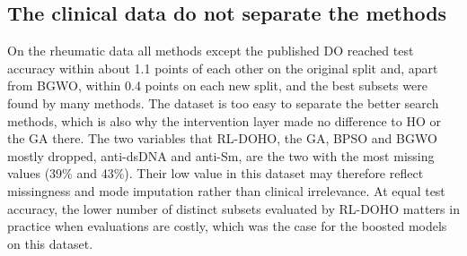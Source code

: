 \documentclass[pdflatex,sn-basic]{sn-jnl}
\begin{document}
\subsection{The clinical data do not separate the methods}
On the rheumatic data all methods except the published DO reached test accuracy within about 1.1 points of each other on the original split and, apart from BGWO, within 0.4 points on each new split, and the best subsets were found by many methods. The dataset is too easy to separate the better search methods, which is also why the intervention layer made no difference to HO or the GA there. The two variables that RL-DOHO, the GA, BPSO and BGWO mostly dropped, anti-dsDNA and anti-Sm, are the two with the most missing values (39\% and 43\%). Their low value in this dataset may therefore reflect missingness and mode imputation rather than clinical irrelevance. At equal test accuracy, the lower number of distinct subsets evaluated by RL-DOHO matters in practice when evaluations are costly, which was the case for the boosted models on this dataset.
\end{document}
